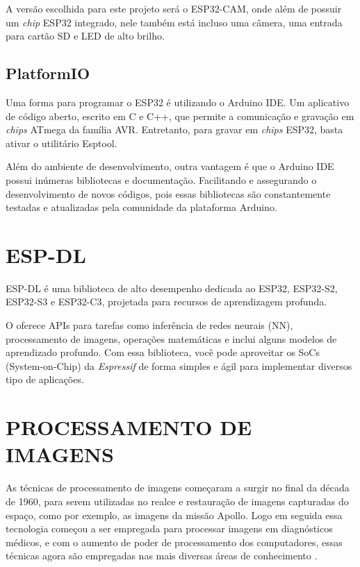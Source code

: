 A versão escolhida para este projeto será o ESP32-CAM, onde além de possuir um 
\textit{chip} ESP32 integrado, nele também está incluso uma câmera, uma entrada para 
cartão SD e LED de alto brilho.

\subsection{PlatformIO}\label{sec:espacamento}

Uma forma para programar o ESP32 é utilizando o Arduino IDE. Um aplicativo de 
código aberto, escrito em C e C++, que permite a comunicação e gravação em \textit{chips} 
ATmega da família AVR. Entretanto, para gravar em \textit{chips} ESP32, basta ativar 
o utilitário Esptool.

Além do ambiente de desenvolvimento, outra vantagem é que o Arduino IDE 
possui inúmeras bibliotecas e documentação. Facilitando e assegurando o 
desenvolvimento de novos códigos, pois essas bibliotecas são constantemente 
testadas e atualizadas pela comunidade da plataforma Arduino.

\section{ESP-DL}\label{sec:formatacaoTexto}

ESP-DL é uma biblioteca de alto desempenho dedicada ao ESP32, ESP32-S2, 
ESP32-S3 e ESP32-C3, projetada para recursos de aprendizagem profunda. 

O  oferece APIs para tarefas como inferência de redes 
neurais (NN), processamento de imagens, operações matemáticas e inclui 
alguns modelos de aprendizado profundo. Com essa biblioteca, você 
pode aproveitar os SoCs (System-on-Chip) da \textit{Espressif} de forma simples 
e ágil para implementar diversos tipo de aplicações.

\section{PROCESSAMENTO DE IMAGENS}\label{sec:processamento}

As técnicas de processamento de imagens começaram a surgir no final da década de 1960, 
para serem utilizadas no realce e restauração de imagens capturadas do espaço, 
como por exemplo, as imagens da missão Apollo. Logo em seguida essa tecnologia 
começou a ser empregada para processar imagens em diagnósticos médicos, e com 
o aumento de poder de processamento dos computadores, essas técnicas agora 
são empregadas nas mais diversas áreas de conhecimento \cite{gonzalez2010}.

